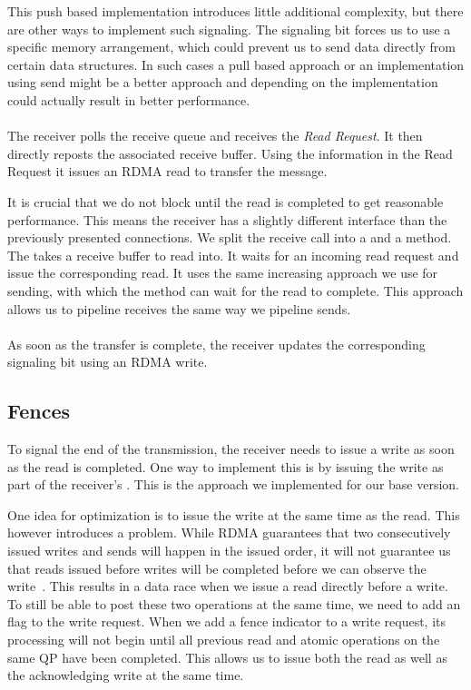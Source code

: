 This push based implementation introduces little additional complexity, but there are other ways to implement such 
signaling. The signaling bit forces us to use a specific memory arrangement, which could prevent us to send data directly 
from certain data structures. In such cases a pull based approach or an implementation using send might be a better approach
and depending on the implementation could actually result in better performance.

\paragraph{} The receiver polls the receive queue and receives the \emph{Read Request}. It then directly reposts the associated 
receive buffer. Using the information in the Read Request it issues an RDMA read to transfer the message. 


It is crucial that we do not block until the read is completed to get reasonable performance.  This means the receiver has a
slightly different interface than the previously presented connections. We split the receive call into a 
 and a  method. The  takes a receive buffer
to read into. It  waits for an incoming read request and issue the corresponding read. It uses the same increasing 
 approach we use for sending, with which the  method can wait for the read to complete. This approach
allows us to pipeline receives the same way we pipeline sends.

\paragraph{} As soon as the transfer is complete, the receiver updates the corresponding signaling bit using an RDMA write.

\subsection{Fences}

To signal the end of the transmission, the receiver needs to issue a write as soon as the read is completed. One way to 
implement this is by issuing the write as part of the receiver's . This is the approach we implemented for our
base version.

One idea for optimization is to issue the write at the same time as the read. This however introduces a 
problem. While RDMA guarantees that two consecutively issued writes and sends will happen in the issued order, 
it will not guarantee us that reads issued before writes will be completed before we can observe the write~\cite{rdma-reference}.
This results in a data race when we issue a read directly before a write. To still be able to post these two operations 
at the same time, we need to add an  flag to the write request. When we add a fence indicator to a write
request, its processing will not begin until all previous read and atomic operations on the same QP  have been completed. This 
allows us to issue both the read as well as the acknowledging write at the same time.

